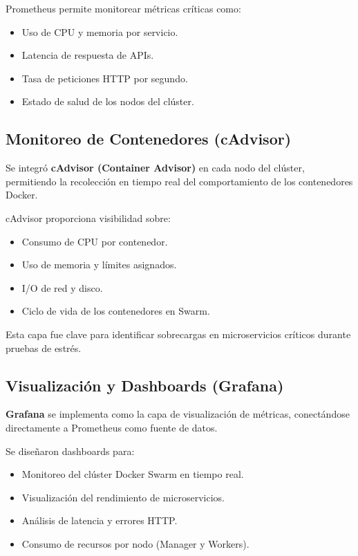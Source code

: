 \documentclass[conference]{IEEEtran}
\begin{document}
Prometheus permite monitorear métricas críticas como:
\begin{itemize}
    \item Uso de CPU y memoria por servicio.
    \item Latencia de respuesta de APIs.
    \item Tasa de peticiones HTTP por segundo.
    \item Estado de salud de los nodos del clúster.
\end{itemize}

\subsection{Monitoreo de Contenedores (cAdvisor)}

Se integró \textbf{cAdvisor (Container Advisor)} en cada nodo del clúster, permitiendo la recolección en tiempo real del comportamiento de los contenedores Docker.

cAdvisor proporciona visibilidad sobre:
\begin{itemize}
    \item Consumo de CPU por contenedor.
    \item Uso de memoria y límites asignados.
    \item I/O de red y disco.
    \item Ciclo de vida de los contenedores en Swarm.
\end{itemize}

Esta capa fue clave para identificar sobrecargas en microservicios críticos durante pruebas de estrés.

\subsection{Visualización y Dashboards (Grafana)}

\textbf{Grafana} se implementa como la capa de visualización de métricas, conectándose directamente a Prometheus como fuente de datos.

Se diseñaron dashboards para:
\begin{itemize}
    \item Monitoreo del clúster Docker Swarm en tiempo real.
    \item Visualización del rendimiento de microservicios.
    \item Análisis de latencia y errores HTTP.
    \item Consumo de recursos por nodo (Manager y Workers).
\end{itemize}
\end{document}
